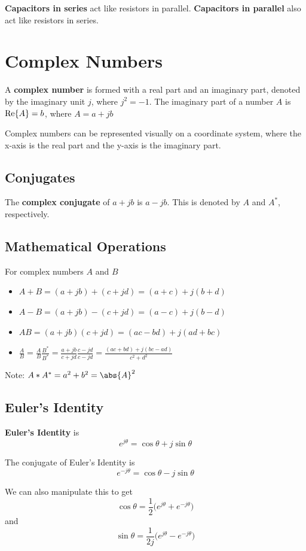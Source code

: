 \documentclass[12pt]{article}
\begin{document}
{\bf Capacitors in series} act like resistors in parallel. {\bf Capacitors in parallel} also act like resistors in series.

\section*{Complex Numbers}
A {\bf complex number} is formed with a real part and an imaginary part, denoted by the imaginary unit $j$, where $j^2 = -1$. The imaginary part of a number $A$ is ${\rm Re}\{A\} = b$, where $A = a + jb$

Complex numbers can be represented visually on a coordinate system, where the x-axis is the real part and the y-axis is the imaginary part.

\subsection*{Conjugates}
The {\bf complex conjugate} of $a + jb$ is $a - jb$. This is denoted by $A$ and $A^*$, respectively.

\subsection*{Mathematical Operations}
For complex numbers $A$ and $B$
\begin{itemize}
\item $A + B = (a + jb) + (c + jd) = (a + c) + j(b + d)$
\item $A - B = (a + jb) - (c + jd) = (a - c) + j(b - d)$
\item $AB = (a + jb)(c + jd) = (ac - bd) + j(ad + bc)$
\item $\frac{A}{B} = \frac{A}{B}\frac{B^*}{B^*} = \frac{a + jb}{c + jd}\frac{c - jd}{c - jd} = \frac{(ac + bd) + j(bc - ad)}{c^2 + d^2}$
\end{itemize}

Note: $A * A^* = a^2 + b^2 = \abs{A}^2$

\subsection*{Euler's Identity}
{\bf Euler's Identity} is \[ e^{j\theta} = \cos\theta + j\sin\theta \]

The conjugate of Euler's Identity is \[ e^{-j\theta} = \cos\theta - j\sin\theta \]

We can also manipulate this to get \[ \cos\theta = \frac{1}{2}\bigl(e^{j\theta} + e^{-j\theta}\bigl) \] and \[ \sin\theta = \frac{1}{2j}\bigl(e^{j\theta} - e^{-j\theta}\bigl) \]
\end{document}
